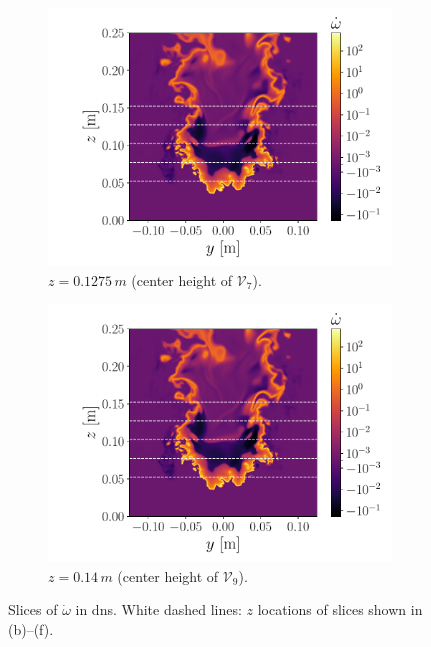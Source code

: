 \documentclass[review]{elsarticle}
\begin{document}
\begin{figure}[!tbp]
\begin{subfigure}[t]{0.48\textwidth}
    \includegraphics[page=5,width=\textwidth, trim = 1.2cm 0cm 0.4cm 0cm, clip=true]{./figs/src_pv.pdf}%
    \caption{$z=0.1275\,\unit{m}$ (center height of $\mathcal{V}_{7}$).}%
  \end{subfigure}\hfill%
  \begin{subfigure}[t]{0.48\textwidth}%
    \includegraphics[page=6,width=\textwidth, trim = 1.2cm 0cm 0.4cm 0cm, clip=true]{./figs/src_pv.pdf}%
    \caption{$z=0.14\,\unit{m}$ (center height of $\mathcal{V}_{9}$).}%
  \end{subfigure}
  \caption{Slices of $\dot{\omega}$ in \gls{dns}. White dashed lines: $z$ locations of slices shown in (b)--(f).}\label{fig:dns}%
\end{figure}%
\end{document}
